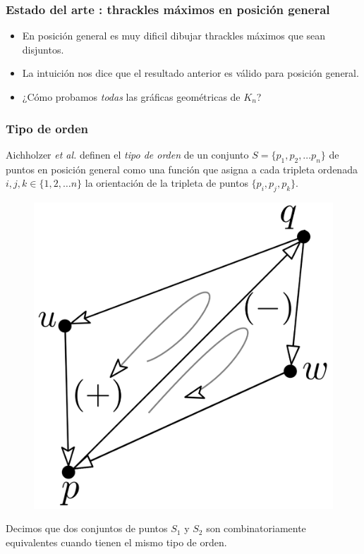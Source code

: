 \begin{frame}
\frametitle{Estado del arte : thrackles máximos en posición general}
\pause
\begin{itemize}
	\item En posición general es muy dificil dibujar thrackles máximos que sean disjuntos.
	\item La intuición nos dice que el resultado anterior es válido para posición general.
	\item ¿Cómo probamos \emph{todas} las gráficas geométricas de $K_n$?
\end{itemize}
\end{frame}

\begin{frame}
\frametitle{Tipo de orden}
Aichholzer \emph{et al.} definen el \emph{tipo de orden} de un conjunto $S=\{p_1,p_2,\dots p_n\}$ de puntos en posición general
como una función que asigna a cada tripleta ordenada $i,j,k\in\{1,2,\dots n\}$ la orientación de la tripleta de puntos $\{p_i,p_j,p_k\}$.
\begin{figure}
	\centering
	\includegraphics[width=0.3\linewidth]{images/triplet}
\end{figure}
Decimos que dos conjuntos de puntos $S_1$ y $S_2$ son combinatoriamente equivalentes cuando tienen el mismo tipo de orden.
\end{frame}

